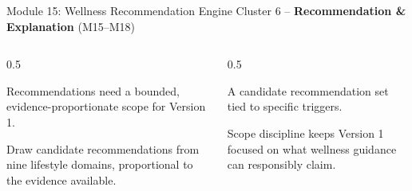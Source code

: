 \documentclass[9pt,aspectratio=169]{beamer}
\begin{document}
\begin{frame}{Module 15: Wellness Recommendation Engine}
\textcolor{black!55}{\scriptsize Cluster 6 -- \textcolor{green!60!black}{\textbf{Recommendation \& Explanation}} (M15--M18)}\\[2pt]
\begin{columns}[T,onlytextwidth]
\begin{column}{0.5\textwidth}
\begin{tcolorbox}[colback=blue!7,colframe=blue!55!black,title=\textbf{Motivation},boxrule=0.6pt,arc=1mm,left=5pt,right=5pt,top=3pt,bottom=3pt,fonttitle=\small]
\footnotesize Recommendations need a bounded, evidence-proportionate scope for Version 1.
\end{tcolorbox}
\vspace{5pt}
\begin{tcolorbox}[colback=teal!7,colframe=teal!55!black,title=\textbf{Method},boxrule=0.6pt,arc=1mm,left=5pt,right=5pt,top=3pt,bottom=3pt,fonttitle=\small]
\footnotesize Draw candidate recommendations from nine lifestyle domains, proportional to the evidence available.
\end{tcolorbox}
\end{column}
\begin{column}{0.5\textwidth}
\begin{tcolorbox}[colback=green!8,colframe=green!45!black,title=\textbf{Result},boxrule=0.6pt,arc=1mm,left=5pt,right=5pt,top=3pt,bottom=3pt,fonttitle=\small]
\footnotesize A candidate recommendation set tied to specific triggers.
\end{tcolorbox}
\vspace{5pt}
\begin{tcolorbox}[colback=orange!10,colframe=orange!65!black,title=\textbf{Conclusion},boxrule=0.6pt,arc=1mm,left=5pt,right=5pt,top=3pt,bottom=3pt,fonttitle=\small]
\footnotesize Scope discipline keeps Version 1 focused on what wellness guidance can responsibly claim.
\end{tcolorbox}
\end{column}
\end{columns}
\end{frame}
\end{document}
